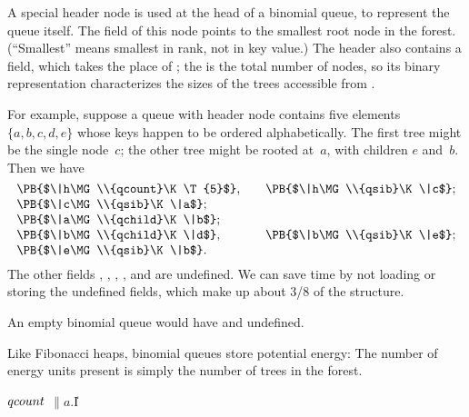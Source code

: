 A special header node is used at the head of a binomial queue, to
represent
the queue itself. The  field of this node points to the smallest
root node in the forest. (``Smallest'' means smallest in rank, not in
key value.) The header also contains a  field, which
takes the place of ; the  is the total number of
nodes,
so its binary representation characterizes the sizes of the trees
accessible from .

For example, suppose a queue with header node  contains five elements
$\{a,b,c,d,e\}$ whose keys happen to be ordered alphabetically. The first
tree might be the single node~$c$; the other tree might be rooted at~$a$,
with children $e$ and~$b$. Then we have
$$\vbox{\halign{#\hfil&\qquad#\hfil\cr
\PB{$\|h\MG\\{qcount}\K\T{5}$},&\PB{$\|h\MG\\{qsib}\K\|c$};\cr
\PB{$\|c\MG\\{qsib}\K\|a$};\cr
\PB{$\|a\MG\\{qchild}\K\|b$};\cr
\PB{$\|b\MG\\{qchild}\K\|d$},&\PB{$\|b\MG\\{qsib}\K\|e$};\cr
\PB{$\|e\MG\\{qsib}\K\|b$}.\cr}}$$
The other fields , , , , and
 are undefined. We can save time by not loading or
storing the
undefined fields, which make up about 3/8 of the structure.

An empty binomial queue would have  and  undefined.

Like Fibonacci heaps, binomial queues store potential energy: The
number of energy units present is simply the number of trees in the forest.

\Y\B\4\D$\\{qcount}$ \5
$\|a.{}$\|I%
\par
\fi

